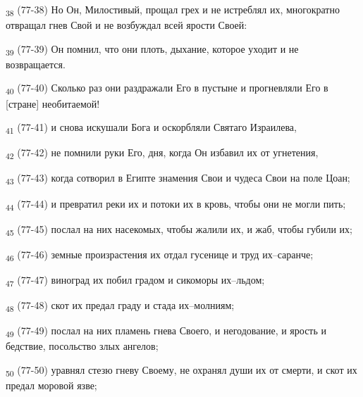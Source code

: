 \begin{tcolorbox}
\textsubscript{38} (77-38) Но Он, Милостивый, прощал грех и не истреблял их, многократно отвращал гнев Свой и не возбуждал всей ярости Своей:
\end{tcolorbox}
\begin{tcolorbox}
\textsubscript{39} (77-39) Он помнил, что они плоть, дыхание, которое уходит и не возвращается.
\end{tcolorbox}
\begin{tcolorbox}
\textsubscript{40} (77-40) Сколько раз они раздражали Его в пустыне и прогневляли Его в [стране] необитаемой!
\end{tcolorbox}
\begin{tcolorbox}
\textsubscript{41} (77-41) и снова искушали Бога и оскорбляли Святаго Израилева,
\end{tcolorbox}
\begin{tcolorbox}
\textsubscript{42} (77-42) не помнили руки Его, дня, когда Он избавил их от угнетения,
\end{tcolorbox}
\begin{tcolorbox}
\textsubscript{43} (77-43) когда сотворил в Египте знамения Свои и чудеса Свои на поле Цоан;
\end{tcolorbox}
\begin{tcolorbox}
\textsubscript{44} (77-44) и превратил реки их и потоки их в кровь, чтобы они не могли пить;
\end{tcolorbox}
\begin{tcolorbox}
\textsubscript{45} (77-45) послал на них насекомых, чтобы жалили их, и жаб, чтобы губили их;
\end{tcolorbox}
\begin{tcolorbox}
\textsubscript{46} (77-46) земные произрастения их отдал гусенице и труд их--саранче;
\end{tcolorbox}
\begin{tcolorbox}
\textsubscript{47} (77-47) виноград их побил градом и сикоморы их--льдом;
\end{tcolorbox}
\begin{tcolorbox}
\textsubscript{48} (77-48) скот их предал граду и стада их--молниям;
\end{tcolorbox}
\begin{tcolorbox}
\textsubscript{49} (77-49) послал на них пламень гнева Своего, и негодование, и ярость и бедствие, посольство злых ангелов;
\end{tcolorbox}
\begin{tcolorbox}
\textsubscript{50} (77-50) уравнял стезю гневу Своему, не охранял души их от смерти, и скот их предал моровой язве;
\end{tcolorbox}

